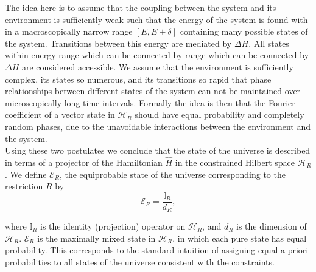 \indent The idea here is to assume that the coupling between the system and its environment is sufficiently weak such that the energy of the system is found with in a macroscopically narrow range $[E,E+\delta]$ containing many possible states of the system. Transitions between this energy are mediated by $\Delta H$. All states within energy range which can be connected by range which can be connected by $\Delta H$ are considered accessible. We assume that the environment is sufficiently complex, its states so numerous, and its transitions so rapid that phase relationships between different states of the system can not be maintained over microscopically long time intervals. Formally the idea is then that the Fourier coefficient of a vector state in $\mathcal{H}_{R}$ should have equal probability and completely random phases, due to the unavoidable interactions between the environment and the system\cite{huang_statistical_1987}.\\

\indent Using these two postulates we conclude that the state of the universe is described in terms of a projector of the Hamiltonian $\hat{H}$ in the constrained Hilbert space $\mathcal{H}_R$. We define $\mathcal{E}_{R}$, the equiprobable state of the universe corresponding to the restriction $R$ by
\begin{equation}
\mathcal{E}_R = \frac{\mathbb{I}_{R}}{d_R},
\label{CH1:equiprobable_state}
\end{equation}

where $\mathbb{I}_{R}$ is the identity (projection) operator on $\mathcal{H}_R$, and $d_R$ is the dimension of $\mathcal{H}_R$. $\mathcal{E}_R$ is the maximally mixed state in $\mathcal{H}_R$, in which each pure state has equal probability. This corresponds to the standard intuition of assigning equal a priori probabilities to all states of the universe consistent with the constraints.

